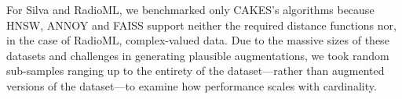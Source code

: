 
For Silva and RadioML, we benchmarked only CAKES's algorithms because HNSW, ANNOY and FAISS support neither the required distance functions nor, in the case of RadioML, complex-valued data.
Due to the massive sizes of these datasets and challenges in generating plausible augmentations, we took random sub-samples ranging up to the entirety of the dataset---rather than augmented versions of the dataset---to examine how performance scales with cardinality.


